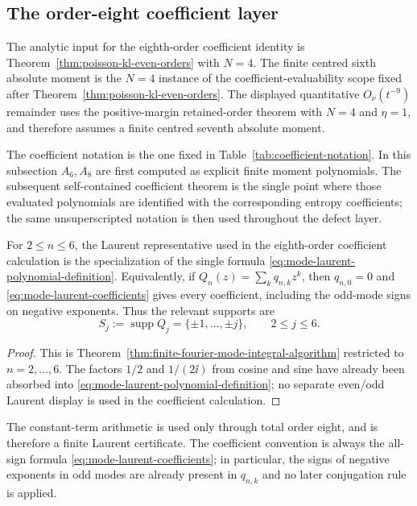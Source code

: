 

\subsection{The order-eight coefficient layer}%
\label{subsec:order-eight-coefficient-layer}
\label{subsec:eighth-order-defects}

The analytic input for the eighth-order coefficient identity is
Theorem~\ref{thm:poisson-kl-even-orders} with \(N=4\).  The finite centred
sixth absolute moment is the \(N=4\) instance of the coefficient-evaluability
scope fixed after Theorem~\ref{thm:poisson-kl-even-orders}.  The displayed
quantitative \(O_\nu(t^{-9})\) remainder uses
the positive-margin retained-order theorem with \(N=4\) and \(\eta=1\),
and therefore assumes a finite centred seventh absolute moment.

The coefficient notation is the one fixed in
Table~\ref{tab:coefficient-notation}.  In this subsection \(A_6,A_8\) are
first computed as explicit finite moment polynomials.  The subsequent
self-contained coefficient theorem is the single point where those evaluated
polynomials are identified with the corresponding entropy coefficients; the
same unsuperscripted notation is then used throughout the defect layer.

\begin{lemma}%
\label{lem:n4-uniform-laurent-representatives}
For \(2\le n\le6\), the Laurent representative used in the eighth-order
coefficient calculation is the specialization of the single formula
\eqref{eq:mode-laurent-polynomial-definition}.  Equivalently, if
\(Q_n(z)=\sum_kq_{n,k}z^k\), then \(q_{n,0}=0\) and
\eqref{eq:mode-laurent-coefficients} gives every coefficient, including the
odd-mode signs on negative exponents.  Thus the relevant supports are
\[
S_j:=\operatorname{supp} Q_j=\{\pm1,\ldots,\pm j\},
\qquad 2\le j\le6.
\]
\end{lemma}

\begin{proof}
This is Theorem~\ref{thm:finite-fourier-mode-integral-algorithm} restricted
to \(n=2,\ldots,6\).  The factors \(1/2\) and \(1/(2\ii)\) from cosine and
sine have already been absorbed into
\eqref{eq:mode-laurent-polynomial-definition}; no separate even/odd Laurent
display is used in the coefficient calculation.
\end{proof}

The constant-term arithmetic is used only through total order eight, and is
therefore a finite Laurent certificate.  The coefficient convention is always
the all-sign formula \eqref{eq:mode-laurent-coefficients}; in particular, the
signs of negative exponents in odd modes are already present in \(q_{n,k}\)
and no later conjugation rule is applied.

